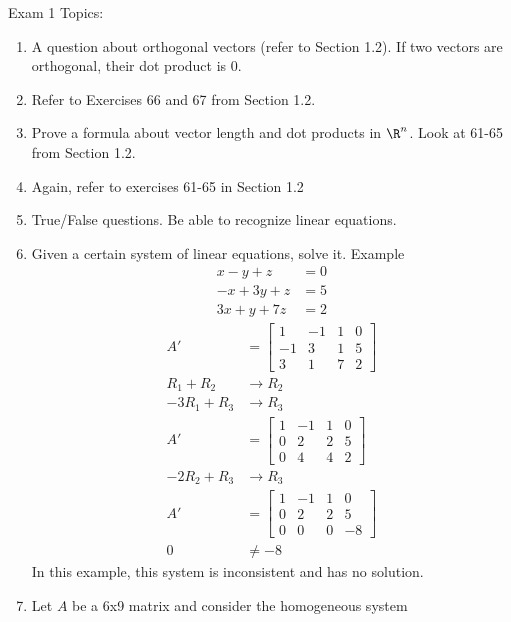 \documentclass[letterpaper, 12pt]{math}
\begin{document}
\noindent Exam 1 Topics:
\begin{enumerate}
  \item A question about orthogonal vectors (refer to Section 1.2). If two
    vectors are orthogonal, their dot product is 0.
  \item Refer to Exercises 66 and 67 from Section 1.2.
  \item Prove a formula about vector length and dot products in \( \R^n \).
    Look at 61-65 from Section 1.2.
  \item Again, refer to exercises 61-65 in Section 1.2
  \item True/False questions. Be able to recognize linear equations.
  \item Given a certain system of linear equations, solve it. Example
    \begin{align*}
      x-y+z &= 0 \\
      -x+3y+z &= 5 \\
      3x+y+7z &= 2
    \end{align*}
    \begin{align*}
      A' &= \left[\begin{array}{ccc|c}
        1 & -1 & 1 & 0 \\
        -1 & 3 & 1 & 5 \\
        3 & 1 & 7 & 2
      \end{array}\right] \\
      R_1+R_2 &\to R_2 \\
      -3R_1+R_3 &\to R_3 \\
      A' &= \left[\begin{array}{ccc|c}
        1 & -1 & 1 & 0 \\
        0 & 2 & 2 & 5 \\
        0 & 4 & 4 & 2
      \end{array}\right] \\
      -2R_2+R_3 &\to R_3 \\
      A' &= \left[\begin{array}{ccc|c}
        1 & -1 & 1 & 0 \\
        0 & 2 & 2 & 5 \\
        0 & 0 & 0 & -8
      \end{array}\right] \\
      0 &\ne -8
    \end{align*}
    In this example, this system is inconsistent and has no solution.
  \item Let \( A \) be a 6x9 matrix and consider the homogeneous system

\end{enumerate}
\end{document}
